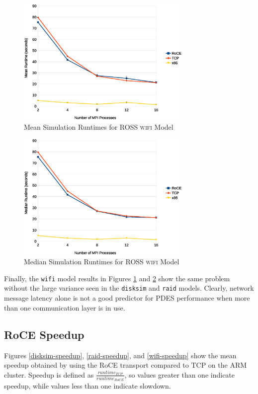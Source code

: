 \documentclass[11pt]{book}
\begin{document}
\begin{figure}
\centering
\includegraphics[width=0.75\textwidth]{wifi}
\caption{Mean Simulation Runtimes for ROSS \textsc{wifi} Model}
\label{wifi}
\end{figure}

\begin{figure}
\centering
\includegraphics[width=0.75\textwidth]{wifi_median}
\caption{Median Simulation Runtimes for ROSS \textsc{wifi} Model}
\label{wifi-median}
\end{figure}

Finally, the \verb;wifi; model results in Figures \ref{wifi} and
\ref{wifi-median} show the same problem without the large variance seen
in the \verb;disksim; and \verb;raid; models. Clearly, network message latency
alone is not a good predictor for PDES performance when more than one
communication layer is in use.


\subsection{RoCE Speedup}

Figures \ref{disksim-speedup}, \ref{raid-speedup}, and
\ref{wifi-speedup} show the mean speedup obtained by using the RoCE
transport compared to TCP on the ARM cluster. Speedup is defined as
$\frac{runtime_{TCP}}{runtime_{RoCE}}$, so values greater than one indicate speedup,
while values less than one indicate slowdown.
\end{document}
